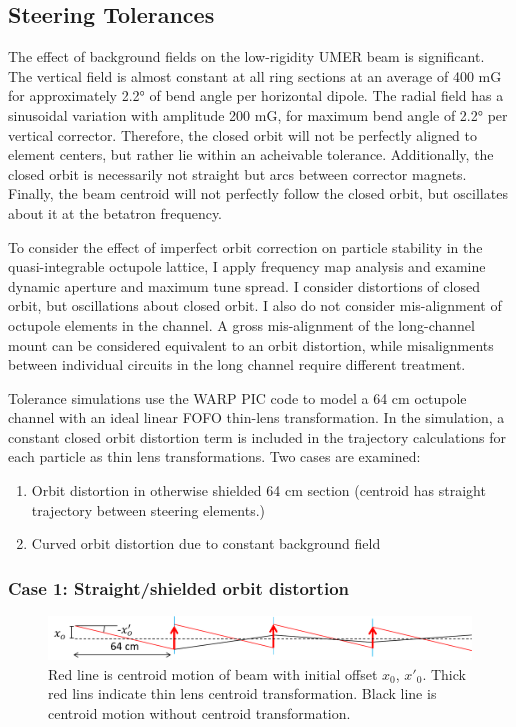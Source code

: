 \subsection{Steering Tolerances}

The effect of background fields on the low-rigidity UMER beam is significant.  The vertical field is almost constant at all ring sections at an average of 400 mG for approximately 2.2° of bend angle per horizontal dipole. The radial field has a sinusoidal variation with amplitude 200 mG, for maximum bend angle of 2.2° per vertical corrector. Therefore, the closed orbit will not be perfectly aligned to element centers, but rather lie within an acheivable tolerance. Additionally, the closed orbit is necessarily not straight but arcs between corrector magnets. Finally, the beam centroid will not perfectly follow the closed orbit, but oscillates about it at the betatron frequency. 

To consider the effect of imperfect orbit correction on particle stability in the quasi-integrable octupole lattice, I apply frequency map analysis and examine dynamic aperture and maximum tune spread. I consider distortions of closed orbit, but oscillations about closed orbit. I also do not consider mis-alignment of octupole elements in the channel. A gross mis-alignment of the long-channel mount can be considered equivalent to an orbit distortion, while misalignments between individual circuits in the long channel require different treatment.

Tolerance simulations use the WARP PIC code to model a 64 cm octupole channel with an ideal linear FOFO thin-lens transformation. In the simulation, a constant closed orbit distortion term is included in the trajectory calculations for each particle as thin lens transformations. Two cases are examined:

\begin{enumerate}
\item Orbit distortion in otherwise shielded 64 cm section (centroid has straight trajectory between steering elements.)
\item Curved orbit distortion due to constant background field
\end{enumerate}

\subsubsection{Case 1: Straight/shielded orbit distortion}

\begin{figure}
\centering
\includegraphics[width=\textwidth]{7.figures/steeringtolerance/orbit_distortion_cartoon.png}
\caption{Red line is centroid motion of beam with initial offset $x_0$, $x'_0$. Thick red lins indicate thin lens centroid transformation. Black line is centroid motion without centroid transformation.}
\label{fig:straightorbitdistortion}
\end{figure}

